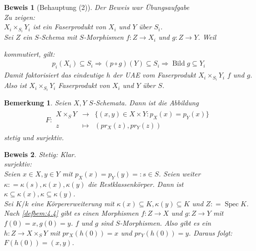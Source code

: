 \documentclass[a4paper,oneside]{scrbook}
\theoremstyle{break}
\newtheorem{Bem}[Def]{Bemerkung}
\theoremstyle{nonumberbreak}
\theoremstyle{nonumberplain}
\newtheorem{Bew}{Beweis}
\theoremstyle{break}
\newcommand{\defeqr}[0]{\mathrel{\mathop:}=}
\newcommand{\defeql}[0]{=\mathrel{\mathop:}}
\newcommand{\Abb}[5]{\ensuremath{#1:\begin{array}{ccc} #2 & \longrightarrow & #3 \\ #4 & \longmapsto & #5 \end{array}}}
\newcommand{\Spec}{%
	\ensuremath{\operatorname{Spec}}%
}
\DeclareMathOperator{\Bild}{Bild}
\begin{document}
\begin{Bew}[Behauptung (2)]
  \emph{Der Beweis war Übungsaufgabe} \\
  Zu zeigen:\\
  $X_i\times_{S_i}Y_i$ ist ein Faserprodukt von $X_i$ und $Y$ über $S_i$. \\
  Sei $Z$ ein $S$-Schema mit $S$-Morphismen $f:Z\to X_i$ und $g:Z\to Y$.
  Weil
  \begin{center}
  \end{center}
  kommutiert, gilt:
  \begin{align*}
    p_i(X_i)\subseteq S_i \Rightarrow (p\circ g)(Y)\subseteq S_i \Rightarrow  \Bild g\subseteq Y_i
  \end{align*}
  Damit faktorisiert das eindeutige $h$ der UAE vom Faserprodukt $X_i\times_{S_i}Y_i$ $f$ und $g$. Also
  ist $X_i\times_{S_i}Y_i$ Faserprodukt von $X_i$ und $Y$ über $S$.
\end{Bew}

\begin{Bem}
  \label{bem:5.2}
  Seien $X,Y$ $S$-Schemata. Dann ist die Abbildung
  \begin{align*}
    \Abb{F}{X\times_S Y}{\{(x,y)\in X\times Y:p_X(x)=p_Y(x)\}}{z}{(pr_X(z),pr_Y(z))}
  \end{align*}
  stetig und surjektiv.
\end{Bem}

\begin{Bew}
  Stetig: Klar. \\
  surjektiv: \\
  Seien $x\in X, y\in Y$ mit $p_X(x)=p_Y(y)\defeql s\in S$. Seien weiter $\kappa\defeqr\kappa(s),\kappa(x),\kappa(y)$ die Restklassenkörper.
  Dann ist $\kappa\subseteq\kappa(x), \kappa\subseteq\kappa(y)$. \\
  Sei $K/k$ eine Körpererweiterung mit $\kappa(x)\subseteq K, \kappa(y)\subseteq K$ und $Z\defeqr\Spec K$.
  Nach \ref{defbem:4.4} gibt es einen Morphismen $f:Z\to X$ und $g:Z\to Y$ mit $f(0)=x,g(0)=y$. $f$ und $g$ sind $S$-Morphismen.
  Also gibt es ein $h:Z\to X\times_S Y$ mit $pr_X(h(0))=x$ und $pr_Y(h(0))=y$. Daraus folgt: $F(h(0))=(x,y)$.
\end{Bew}
\end{document}
